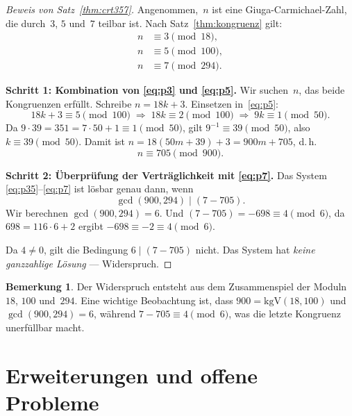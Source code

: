 \documentclass[12pt,a4paper]{amsart}
\theoremstyle{definition}
\newtheorem{remark}[theorem]{Bemerkung}
\begin{document}
\begin{proof}[Beweis von Satz~\ref{thm:crt357}]
Angenommen,~$n$ ist eine Giuga-Carmichael-Zahl, die durch~$3$, $5$ und~$7$ teilbar ist.
Nach Satz~\ref{thm:kongruenz} gilt:
\begin{align}
  n &\equiv 3 \pmod{18},   \label{eq:p3} \\
  n &\equiv 5 \pmod{100},  \label{eq:p5} \\
  n &\equiv 7 \pmod{294}.  \label{eq:p7}
\end{align}

\noindent\textbf{Schritt 1: Kombination von \eqref{eq:p3} und \eqref{eq:p5}.}
Wir suchen~$n$, das beide Kongruenzen erfüllt. Schreibe $n = 18k + 3$.
Einsetzen in~\eqref{eq:p5}:
\[
  18k + 3 \equiv 5 \pmod{100}
  \;\Longrightarrow\;
  18k \equiv 2 \pmod{100}
  \;\Longrightarrow\;
  9k \equiv 1 \pmod{50}.
\]
Da $9 \cdot 39 = 351 = 7 \cdot 50 + 1 \equiv 1 \pmod{50}$, gilt
$9^{-1} \equiv 39 \pmod{50}$, also $k \equiv 39 \pmod{50}$.
Damit ist $n = 18(50m + 39) + 3 = 900m + 705$, d.\,h.\
\begin{equation}
  n \equiv 705 \pmod{900}.
  \label{eq:p35}
\end{equation}

\noindent\textbf{Schritt 2: Überprüfung der Verträglichkeit mit \eqref{eq:p7}.}
Das System \eqref{eq:p35}--\eqref{eq:p7} ist lösbar genau dann, wenn
\[
  \gcd(900, 294) \;\Big|\; (7 - 705).
\]
Wir berechnen $\gcd(900, 294) = 6$. Und $(7 - 705) = -698 \equiv 4 \pmod{6}$,
da $698 = 116 \cdot 6 + 2$ ergibt $-698 \equiv -2 \equiv 4 \pmod{6}$.

Da $4 \ne 0$, gilt die Bedingung $6 \mid (7 - 705)$ nicht.
Das System hat \emph{keine ganzzahlige Lösung} — Widerspruch.
\end{proof}

\begin{remark}
Der Widerspruch entsteht aus dem Zusammenspiel der Moduln $18$, $100$ und~$294$.
Eine wichtige Beobachtung ist, dass $900 = \text{kgV}(18, 100)$ und $\gcd(900, 294) = 6$,
während $7 - 705 \equiv 4 \pmod{6}$, was die letzte Kongruenz unerfüllbar macht.
\end{remark}

\section{Erweiterungen und offene Probleme}
\label{sec:offen}
\end{document}
